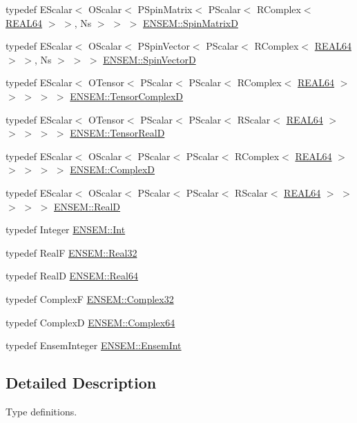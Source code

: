 \begin{DoxyCompactItemize}
\item 
typedef E\+Scalar$<$ O\+Scalar$<$ P\+Spin\+Matrix$<$ P\+Scalar$<$ R\+Complex$<$ \mbox{\hyperlink{adat-devel_2lib_2ensem_2ensem__precision_8h_aa31d9c0fbe9c64fbd64dd463f6e63178}{R\+E\+A\+L64}} $>$ $>$, Ns $>$ $>$ $>$ \mbox{\hyperlink{group__defs_ga9a03c1e03f1df3df33fe8cf7f4a8786f}{E\+N\+S\+E\+M\+::\+Spin\+MatrixD}}
\item 
typedef E\+Scalar$<$ O\+Scalar$<$ P\+Spin\+Vector$<$ P\+Scalar$<$ R\+Complex$<$ \mbox{\hyperlink{adat-devel_2lib_2ensem_2ensem__precision_8h_aa31d9c0fbe9c64fbd64dd463f6e63178}{R\+E\+A\+L64}} $>$ $>$, Ns $>$ $>$ $>$ \mbox{\hyperlink{group__defs_ga9fdac1b0bfb17e095eb78a356858681b}{E\+N\+S\+E\+M\+::\+Spin\+VectorD}}
\item 
typedef E\+Scalar$<$ O\+Tensor$<$ P\+Scalar$<$ P\+Scalar$<$ R\+Complex$<$ \mbox{\hyperlink{adat-devel_2lib_2ensem_2ensem__precision_8h_aa31d9c0fbe9c64fbd64dd463f6e63178}{R\+E\+A\+L64}} $>$ $>$ $>$ $>$ $>$ \mbox{\hyperlink{group__defs_ga36b77f1fc618cfdb020d0b95710f1f87}{E\+N\+S\+E\+M\+::\+Tensor\+ComplexD}}
\item 
typedef E\+Scalar$<$ O\+Tensor$<$ P\+Scalar$<$ P\+Scalar$<$ R\+Scalar$<$ \mbox{\hyperlink{adat-devel_2lib_2ensem_2ensem__precision_8h_aa31d9c0fbe9c64fbd64dd463f6e63178}{R\+E\+A\+L64}} $>$ $>$ $>$ $>$ $>$ \mbox{\hyperlink{group__defs_gacf3d977d3ad24e35a7d782ef367c6c5c}{E\+N\+S\+E\+M\+::\+Tensor\+RealD}}
\item 
typedef E\+Scalar$<$ O\+Scalar$<$ P\+Scalar$<$ P\+Scalar$<$ R\+Complex$<$ \mbox{\hyperlink{adat-devel_2lib_2ensem_2ensem__precision_8h_aa31d9c0fbe9c64fbd64dd463f6e63178}{R\+E\+A\+L64}} $>$ $>$ $>$ $>$ $>$ \mbox{\hyperlink{group__defs_gaf38ee8c84f090ee0c3b76e7a384fb316}{E\+N\+S\+E\+M\+::\+ComplexD}}
\item 
typedef E\+Scalar$<$ O\+Scalar$<$ P\+Scalar$<$ P\+Scalar$<$ R\+Scalar$<$ \mbox{\hyperlink{adat-devel_2lib_2ensem_2ensem__precision_8h_aa31d9c0fbe9c64fbd64dd463f6e63178}{R\+E\+A\+L64}} $>$ $>$ $>$ $>$ $>$ \mbox{\hyperlink{group__defs_ga6436522708cc37b1cb43676ea3b4b2fd}{E\+N\+S\+E\+M\+::\+RealD}}
\item 
typedef Integer \mbox{\hyperlink{group__defs_ga2cef3ec3b63edbe6be5af6e7be8c7f34}{E\+N\+S\+E\+M\+::\+Int}}
\item 
typedef RealF \mbox{\hyperlink{group__defs_gab601f1c55eb75baed0a0859b3fec6bc1}{E\+N\+S\+E\+M\+::\+Real32}}
\item 
typedef RealD \mbox{\hyperlink{group__defs_gaae0bff35c031375b1ffeb693402496c8}{E\+N\+S\+E\+M\+::\+Real64}}
\item 
typedef ComplexF \mbox{\hyperlink{group__defs_ga33929081b433314a8e5ae47f774c90b4}{E\+N\+S\+E\+M\+::\+Complex32}}
\item 
typedef ComplexD \mbox{\hyperlink{group__defs_gade5a0616c06f3019ee74a69dbb42258f}{E\+N\+S\+E\+M\+::\+Complex64}}
\item 
typedef Ensem\+Integer \mbox{\hyperlink{group__defs_ga6d7c35bdb86ebd3d266279dd270ccd74}{E\+N\+S\+E\+M\+::\+Ensem\+Int}}
\end{DoxyCompactItemize}


\subsection{Detailed Description}
Type definitions. 

